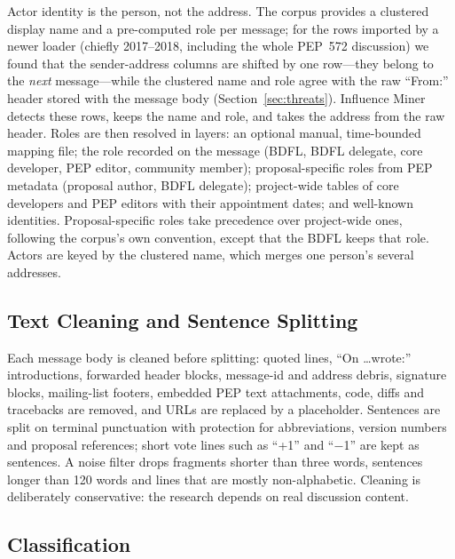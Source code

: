 \documentclass[sigconf,screen]{acmart}
\begin{document}
Actor identity is the person, not the address. The corpus provides a clustered display name and a pre-computed role per message; for the rows imported by a newer loader (chiefly 2017--2018, including the whole PEP~572 discussion) we found that the sender-address columns are shifted by one row---they belong to the \emph{next} message---while the clustered name and role agree with the raw ``From:'' header stored with the message body (Section~\ref{sec:threats}). Influence Miner detects these rows, keeps the name and role, and takes the address from the raw header. Roles are then resolved in layers: an optional manual, time-bounded mapping file; the role recorded on the message (BDFL, BDFL delegate, core developer, PEP editor, community member); proposal-specific roles from PEP metadata (proposal author, BDFL delegate); project-wide tables of core developers and PEP editors with their appointment dates; and well-known identities. Proposal-specific roles take precedence over project-wide ones, following the corpus's own convention, except that the BDFL keeps that role. Actors are keyed by the clustered name, which merges one person's several addresses.

\subsection{Text Cleaning and Sentence Splitting}

Each message body is cleaned before splitting: quoted lines, ``On \ldots wrote:'' introductions, forwarded header blocks, message-id and address debris, signature blocks, mailing-list footers, embedded PEP text attachments, code, diffs and tracebacks are removed, and URLs are replaced by a placeholder. Sentences are split on terminal punctuation with protection for abbreviations, version numbers and proposal references; short vote lines such as ``+1'' and ``$-$1'' are kept as sentences. A noise filter drops fragments shorter than three words, sentences longer than 120 words and lines that are mostly non-alphabetic. Cleaning is deliberately conservative: the research depends on real discussion content.

\subsection{Classification}
\end{document}

